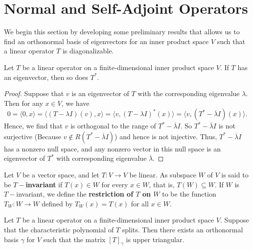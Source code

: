 \section{Normal and Self-Adjoint Operators}

We begin this section by developing some preliminary results that allows us to find an orthonormal basis of eigenvectors for an inner product space \( V  \) such that a linear operator \(  T  \) is diagonalizable.

\begin{lemma}
    Let \( T  \) be a linear operator on a finite-dimensional inner product space \( V  \). If \( T  \) has an eigenvector, then so does \( T^{*} \).
\end{lemma}
\begin{proof}
Suppose that \( v  \) is an eigenvector of \( T  \) with the corresponding eigenvalue \( \lambda  \). Then for any \( x \in V  \), we have
\[  0 = \langle 0  , x  \rangle =  \langle  (T - \lambda I )(v) , x   \rangle = \langle v  ,  (T - \lambda I )^{*}(x) \rangle = \langle v  ,  (T^{*} - \overline{\lambda} I)(x) \rangle. \]
Hence, we find that \( v  \) is orthogonal to the range of \( T^{*} - \overline{\lambda} I  \). So \( T^{*} - \overline{\lambda} I  \) is not surjective (Because \( v \notin R(T^{*} - \overline{\lambda} I ) \)) and hence is not injective. Thus,  \( T^{*} - \overline{\lambda}I  \) has a nonzero null space, and any nonzero vector in this null space is an eigenvector of \( T^{*} \) with corresponding eigenvalue \( \overline{\lambda} \).
\end{proof}

\begin{definition}[T-Invariance]
    Let \( V  \) be a vector space, and let \( T: V \to V  \) be linear. As subspace \( W  \) of \( V  \) is said to be \textbf{\( T- \)invariant} if \( T(x) \in W  \) for every \( x \in W  \), that is, \( T(W) \subseteq W  \). If \( W  \) is \( T- \)invariant, we define the \textbf{restriction of \( T \) on \( W  \)} to be the function \( {T}_{W}: W \to W  \) defined by \( {T}_{W}(x) = T(x) \) for all \( x \in W \).
\end{definition}

\begin{theorem}[Schur]
    Let \( T  \) be a linear operator on a finite-dimensional inner product space \( V  \). Suppose that the characteristic polynomial of \( T \) splits. Then there exists an orthonormal basis \( \gamma \) for \( V  \) such that the matrix \( [T]_{\gamma} \) is upper triangular.
\end{theorem}

